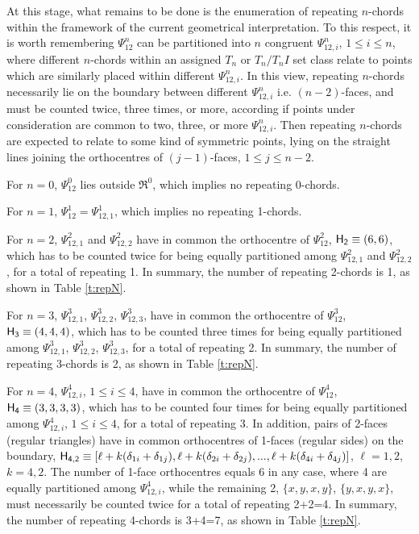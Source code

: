 \documentclass[12pt,a4paper]{article}
\begin{document}
At this stage, what remains to be done is the enumeration of repeating
$n$-chords
within the framework of the current geometrical interpretation.   To this
respect, it is worth remembering $\Psi_{12}^n$ can be partitioned into $n$
congruent $\Psi_{12,i}^n$, $1\le i\le n$, where different $n$-chords within
an assigned $T_n$ or $T_n/T_nI$ set class relate to points which are similarly
placed within different
$\Psi_{12,i}^n$.   In this view, repeating $n$-chords necessarily lie on the
boundary between different $\Psi_{12,i}^n$ i.e. $(n-2)$-faces, and must be
counted twice, three times, or more, according if points under consideration
are common to two, three, or more $\Psi_{12,i}^n$.
%
%
Then repeating
$n$-chords are expected to relate to some kind of symmetric points, lying on
the straight lines joining the orthocentres of $(j-1)$-faces,
$1\le j\le n-2$.

For $n=0$, $\Psi_{12}^0$ lies outside $\Re^0$, which implies no repeating
0-chords.

For $n=1$, $\Psi_{12}^1=\Psi_{12,1}^1$, which implies no repeating 1-chords.

For $n=2$, $\Psi_{12,1}^2$ and $\Psi_{12,2}^2$ have in common the orthocentre
of $\Psi_{12}^2$, ${\sf H_2}\equiv(6,6)$, which has to be counted twice for
being equally partitioned among $\Psi_{12,1}^2$ and $\Psi_{12,2}^2$, for a
total of repeating 1.   In summary, the number of repeating 2-chords is
1, as shown in Table \ref{t:repN}.

For $n=3$, $\Psi_{12,1}^3$, $\Psi_{12,2}^3$, $\Psi_{12,3}^3$, have in common
the orthocentre of $\Psi_{12}^3$, ${\sf H_3}\equiv(4,4,4)$, which has to be
counted three times for being equally partitioned among $\Psi_{12,1}^3$,
$\Psi_{12,2}^3$, $\Psi_{12,3}^3$, for a total of repeating 2.   In summary,
the number of repeating 3-chords is 2, as shown in Table \ref{t:repN}.

For $n=4$, $\Psi_{12,i}^4$, $1\le i\le4$, have in common
the orthocentre of $\Psi_{12}^4$, ${\sf H_4}\equiv(3,3,3,3)$, which has to be
counted four times for being equally partitioned among $\Psi_{12,i}^4$,
$1\le i\le4$, for a total of repeating 3.    In addition, pairs of 2-faces
(regular triangles) have in common orthocentres of 1-faces (regular sides) on
the boundary, ${\sf H_{4,2}}\equiv[\ell+k(\delta_{1i}+\delta_{1j}),
\ell+k(\delta_{2i}+\delta_{2j}),...,\ell+k(\delta_{4i}+\delta_{4j})]$,
$\ell=1,2$, $k=4,2$.   The number of 1-face orthocentres equals 6 in any case,
where 4 are equally partitioned among $\Psi_{12,i}^4$, while the remaining 2,
$\{x,y,x,y\}$, $\{y,x,y,x\}$, must necessarily be counted twice for a total of
repeating 2+2=4.   In summary, the number of repeating 4-chords is 3+4=7,
as shown in Table \ref{t:repN}.
\end{document}
